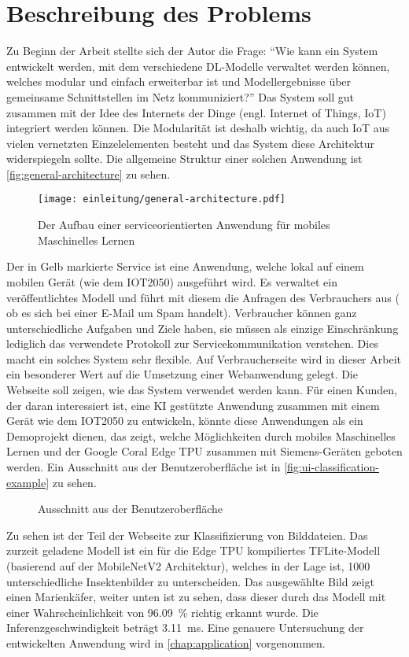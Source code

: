 \section{Beschreibung des Problems}
\label{sec:problem-description}
Zu Beginn der Arbeit stellte sich der Autor die Frage:
\enquote{Wie kann ein System entwickelt werden, mit dem verschiedene DL-Modelle
  verwaltet werden können, welches modular und einfach erweiterbar ist
  und Modellergebnisse über gemeinsame Schnittstellen im Netz kommuniziert?}
Das System soll gut zusammen mit der Idee des Internets der Dinge
(engl. Internet of Things, IoT) integriert werden können.
Die Modularität ist deshalb wichtig, da auch IoT aus vielen vernetzten
Einzelelementen besteht und das System diese Architektur widerspiegeln sollte.
Die allgemeine Struktur einer solchen Anwendung ist \autoref{fig:general-architecture} zu
sehen. 
\begin{figure}[h!]
  \centering
  \texttt{[image: einleitung/general-architecture.pdf]}
  \caption{Der Aufbau einer serviceorientierten Anwendung für mobiles Maschinelles Lernen}
  \label{fig:general-architecture}
\end{figure}

\noindent
Der in Gelb markierte Service ist eine Anwendung, welche
lokal auf einem mobilen Gerät (wie dem IOT2050) ausgeführt wird.
Es verwaltet ein veröffentlichtes Modell und führt mit diesem
die Anfragen des Verbrauchers aus (\zB{} ob es sich bei einer E-Mail um Spam handelt).
Verbraucher können ganz unterschiedliche Aufgaben und Ziele haben, sie müssen
als einzige Einschränkung lediglich das verwendete Protokoll
zur Servicekommunikation verstehen.
Dies macht ein solches System sehr flexible.
Auf Verbraucherseite wird in dieser Arbeit
ein besonderer Wert auf die Umsetzung einer Webanwendung gelegt.
Die Webseite soll zeigen, wie das System verwendet
werden kann. Für einen Kunden, der daran interessiert ist, eine
KI gestützte Anwendung zusammen mit einem Gerät wie dem IOT2050
zu entwickeln, könnte diese Anwendungen als ein Demoprojekt dienen,
das zeigt, welche Möglichkeiten durch mobiles
Maschinelles Lernen und der Google Coral Edge TPU zusammen mit Siemens-Geräten
geboten werden.
Ein Ausschnitt aus der Benutzeroberfläche ist in
\autoref{fig:ui-classification-example} zu sehen.
\newpage
\begin{figure}[h!]
  \centering
  \caption{Ausschnitt aus der Benutzeroberfläche}
  \label{fig:ui-classification-example}
\end{figure}
\noindent
Zu sehen ist der Teil der Webseite zur Klassifizierung von Bilddateien.
Das zurzeit geladene Modell ist ein für die Edge TPU kompiliertes
TFLite-Modell (basierend auf der MobileNetV2 Architektur),
welches in der Lage ist, 1000 unterschiedliche
Insektenbilder zu unterscheiden. Das ausgewählte Bild zeigt
einen Marienkäfer, weiter unten ist zu sehen, dass dieser durch das Modell mit
einer Wahrscheinlichkeit von \qty{96.09}{\percent} richtig erkannt wurde.
Die Inferenzgeschwindigkeit beträgt \qty{3.11}{\milli\second}.
Eine genauere Untersuchung der entwickelten Anwendung wird
in \autoref{chap:application} vorgenommen.